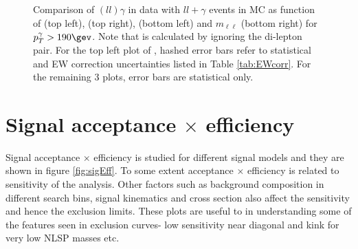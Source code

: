 \begin{figure}[h!]
\caption{Comparison of $(ll)\gamma$ in data with $ll+\gamma$ events in MC as function of \ptmiss (top left), \nj (top right), \nb (bottom left) and $m_{\ell\ell}$ (bottom right) for $p_T^{\gamma}>190\gev$. Note that \ptmiss is calculated by ignoring the di-lepton pair. For the top left plot of \ptmiss, hashed error bars refer to statistical and EW correction uncertainties listed in Table \ref{tab:EWcorr}. For the remaining 3 plots, error bars are statistical only.}
\label{fig:llGammaDataMC}
\end{figure}

\section{Signal acceptance $\times$ efficiency}
\label{sec:SigAccEff}
Signal acceptance $\times$ efficiency is studied for different signal models and they are shown in figure \ref{fig:sigEff}. To some extent acceptance $\times$ efficiency is related to sensitivity of the analysis. Other factors such as background composition in different search bins, signal kinematics and cross section also affect the sensitivity and hence the exclusion limits. These plots are useful to in understanding some of the features seen in exclusion curves- low sensitivity near diagonal and kink for very low NLSP masses etc.
